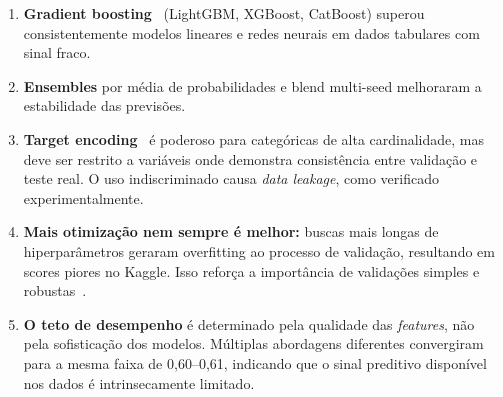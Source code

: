 \documentclass[12pt, a4paper]{article}
\begin{document}
\begin{enumerate}[leftmargin=2em]
  \item \textbf{Gradient boosting}~\cite{ref:friedman} (LightGBM, XGBoost, CatBoost) superou consistentemente modelos lineares e redes neurais em dados tabulares com sinal fraco.

  \item \textbf{Ensembles} por média de probabilidades e blend multi-seed melhoraram a estabilidade das previsões.

  \item \textbf{Target encoding}~\cite{ref:micci} é poderoso para categóricas de alta cardinalidade, mas deve ser restrito a variáveis onde demonstra consistência entre validação e teste real. O uso indiscriminado causa \textit{data leakage}, como verificado experimentalmente.

  \item \textbf{Mais otimização nem sempre é melhor:} buscas mais longas de hiperparâmetros geraram overfitting ao processo de validação, resultando em scores piores no Kaggle. Isso reforça a importância de validações simples e robustas~\cite{ref:hastie}.

  \item \textbf{O teto de desempenho} é determinado pela qualidade das \textit{features}, não pela sofisticação dos modelos. Múltiplas abordagens diferentes convergiram para a mesma faixa de 0,60--0,61, indicando que o sinal preditivo disponível nos dados é intrinsecamente limitado.
\end{enumerate}
\end{document}
